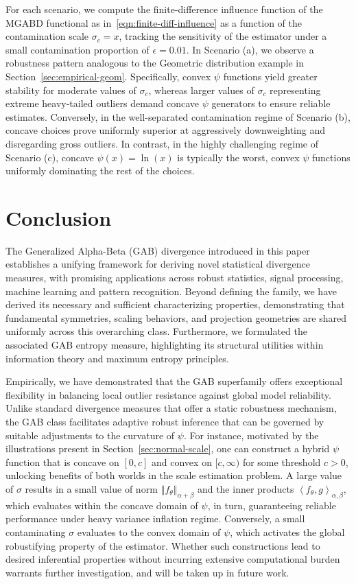 \documentclass[11pt]{article}
\theoremstyle{plain}
\theoremstyle{remark}
\newcommand{\norm}[1]{\left\Vert #1 \right\Vert}
\newcommand{\inner}[1]{\left\langle #1\right\rangle}
\begin{document}
For each scenario, we compute the finite-difference influence function of the MGABD functional as in~\eqref{eqn:finite-diff-influence} as a function of the contamination scale $\sigma_c = x$, tracking the sensitivity of the estimator under a small contamination proportion of $\epsilon = 0.01$. In Scenario (a), we observe a robustness pattern analogous to the Geometric distribution example in Section~\ref{sec:empirical-geom}. Specifically, convex $\psi$ functions yield greater stability for moderate values of $\sigma_c$, whereas larger values of $\sigma_c$ representing extreme heavy-tailed outliers demand concave $\psi$ generators to ensure reliable estimates. Conversely, in the well-separated contamination regime of Scenario (b), concave choices prove uniformly superior at aggressively downweighting and disregarding gross outliers. In contrast, in the highly challenging regime of Scenario (c), concave $\psi(x) = \ln(x)$ is typically the worst, convex $\psi$ functions uniformly dominating the rest of the choices.


\section{Conclusion}\label{sec:conclusion}

The Generalized Alpha-Beta (GAB) divergence introduced in this paper establishes a unifying framework for deriving novel statistical divergence measures, with promising applications across robust statistics, signal processing, machine learning and pattern recognition. Beyond defining the family, we have derived its necessary and sufficient characterizing properties, demonstrating that fundamental symmetries, scaling behaviors, and projection geometries are shared uniformly across this overarching class. Furthermore, we formulated the associated GAB entropy measure, highlighting its structural utilities within information theory and maximum entropy principles.

Empirically, we have demonstrated that the GAB superfamily offers exceptional flexibility in balancing local outlier resistance against global model reliability. Unlike standard divergence measures that offer a static robustness mechanism, the GAB class facilitates adaptive robust inference that can be governed by suitable adjustments to the curvature of $\psi$. For instance, motivated by the illustrations present in Section~\ref{sec:normal-scale}, one can construct a hybrid $\psi$ function that is concave on $[0, c]$ and convex on $[c, \infty)$ for some threshold $c > 0$, unlocking benefits of both worlds in the scale estimation problem. A large value of $\sigma$ results in a small value of norm $\norm{f_{\theta}}_{\alpha+\beta}$ and the inner products $\inner{f_\theta, g}_{\alpha,\beta}$, which evaluates within the concave domain of $\psi$, in turn, guaranteeing reliable performance under heavy variance inflation regime. Conversely, a small contaminating $\sigma$ evaluates to the convex domain of $\psi$, which activates the global robustifying property of the estimator. Whether such constructions lead to desired inferential properties without incurring extensive computational burden warrants further investigation, and will be taken up in future work.
\end{document}

